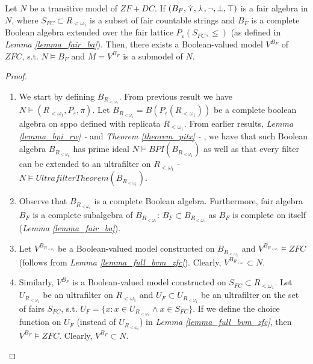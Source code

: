 \begin{lemma}\label{lemma_submodel}
    Let $N$ be a transitive model of $ZF+DC$. If $(B_{F}, \dot{\curlyvee}, \dot{\curlywedge}, \neg, \bot, \top)$ is a fair algebra in $N$, where $S_{FC} \subset R_{<\omega_1}$ is a subset of fair countable strings and $B_{F}$ is a complete Boolean algebra extended over the fair lattice $P_{\varepsilon}(S_{FC}, \leq)$ (as defined in \textit{Lemma \ref{lemma_fair_ba}}). Then, there exists a Boolean-valued model $V^{B_F}$ of $ZFC$, s.t. $N \models B_F$ and $M = V^{B_F}$ is a submodel of $N$.
\end{lemma}
\begin{proof}
    \begin{enumerate}
        \item We start by defining $B_{R_{<\omega_1}}$. From previous result we have $N \models (R_{<\omega_1}, P_\varepsilon, \pi)$. Let $B_{R_{<\omega_1}} = B(P_\varepsilon(R_{<\omega_1}))$ be a complete boolean algebra on sppo defined with replicata $R_{<\omega_1}$. From earlier results, \textit{Lemma \ref{lemma_bpi_rw} - } and \textit{Theorem \ref{theorem_pitx} - }, we have that such Boolean algebra $B_{R_{<\omega_1}}$ has prime ideal $N \models BPI(B_{R_{<\omega_1}})$ as well as that every filter can be extended to an ultrafilter on $R_{<\omega_1}$ - $N \models UltrafilterTheorem(B_{R_{<\omega_1}})$.
        \item Observe that $B_{R_{<\omega_1}}$ is a complete Boolean algebra. Furthermore, fair algebra $B_F$ is a complete subalgebra of $B_{R_{<\omega_1}}$: $B_F \subset B_{R_{<\omega_1}}$ as $B_F$ is complete on itself (\textit{Lemma \ref{lemma_fair_ba}}).
        \item Let $V^{B_{R_{<\omega_1}}}$ be a Boolean-valued model constructed on $B_{R_{<\omega_1}}$ and $V^{B_{R_{<\omega_1}}} \models ZFC$ (follows from \textit{Lemma \ref{lemma_full_bvm_zfc}}). Clearly, $V^{B_{R_{<\omega_1}}} \subset N$.
        \item Similarly, $V^{B_F}$ is a Boolean-valued model constructed on $S_{FC} \subset R_{<\omega_1}$. Let $U_{R_{<\omega_1}}$ be an ultrafilter on $R_{<\omega_1}$ and $U_F \subset U_{R_{<\omega_1}}$ be an ultrafilter on the set of fairs $S_{FC}$, s.t. $U_F = \{ x : x \in U_{R_{<\omega_1}} \land x \in S_{FC}\}$. If we define the choice function on $U_F$ (instead of $U_{R_{<\omega_1}}$) in \textit{Lemma \ref{lemma_full_bvm_zfc}}, then $V^{B_F} \models ZFC$. Clearly, $V^{B_F} \subset N$.
    \end{enumerate}
\end{proof}

